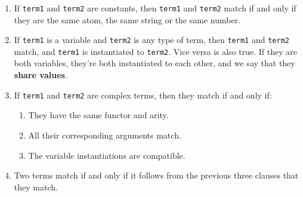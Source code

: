 
\begin{frame}
	\frametitle{\insertsection}
	\begin{enumerate}
		\item If \texttt{term1} and \texttt{term2} are constants, then \texttt{term1} and \texttt{term2} match if and only if they are the same atom, the same string or the same number.
		\item If \texttt{term1} is a variable and \texttt{term2} is any type of term, then \texttt{term1} and \texttt{term2} match, and \texttt{term1} is instantiated to \texttt{term2}. Vice versa is also true. If they are both variables, they’re both instantiated to each other, and we say that they \textbf{share values}.
		\item If \texttt{term1} and \texttt{term2} are complex terms, then they match if and only if:
		\begin{enumerate}
			\item They have the same functor and arity.
			\item All their corresponding arguments match.
			\item The variable instantiations are compatible.
		\end{enumerate}
		\item Two terms match if and only if it follows from the previous three clauses that they match.
	\end{enumerate}
\end{frame}

